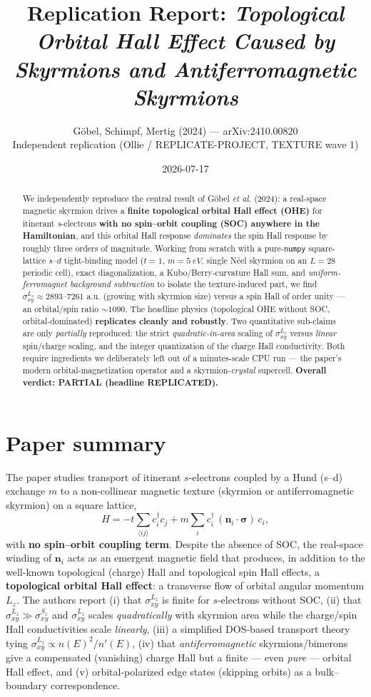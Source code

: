 \documentclass[11pt]{article}
\title{Replication Report: \emph{Topological Orbital Hall Effect Caused by Skyrmions and Antiferromagnetic Skyrmions}}
\author{Göbel, Schimpf, Mertig (2024) --- arXiv:2410.00820 \\[4pt]
\normalsize Independent replication (Ollie / REPLICATE-PROJECT, TEXTURE wave 1)}
\date{2026-07-17}
\newcommand{\sigLz}{\sigma^{L_z}_{xy}}
\newcommand{\sigSz}{\sigma^{S_z}_{xy}}
\begin{document}
\maketitle

\begin{abstract}
We independently reproduce the central result of Göbel \emph{et al.} (2024): a real-space
magnetic skyrmion drives a \textbf{finite topological orbital Hall effect (OHE)} for
itinerant \emph{s}-electrons \textbf{with no spin--orbit coupling (SOC) anywhere in the
Hamiltonian}, and this orbital Hall response \emph{dominates} the spin Hall response by
roughly three orders of magnitude. Working from scratch with a pure-\texttt{numpy}
square-lattice $s$--$d$ tight-binding model ($t=1$, $m=\SI{5}{eV}$, single N\'eel skyrmion
on an $L=28$ periodic cell), exact diagonalization, a Kubo/Berry-curvature Hall sum, and
\emph{uniform-ferromagnet background subtraction} to isolate the texture-induced part, we
find $\sigLz \approx 2893$--$7261$ a.u. (growing with skyrmion size) versus a spin Hall of
order unity --- an orbital/spin ratio $\sim\!1090$. The headline physics
(topological OHE without SOC, orbital-dominated) \textbf{replicates cleanly and robustly}.
Two quantitative sub-claims are only \emph{partially} reproduced: the strict
\emph{quadratic-in-area} scaling of $\sigLz$ versus \emph{linear} spin/charge scaling, and
the integer quantization of the charge Hall conductivity. Both require ingredients we
deliberately left out of a minutes-scale CPU run --- the paper's modern
orbital-magnetization operator and a skyrmion-\emph{crystal} supercell.
\textbf{Overall verdict: PARTIAL (headline REPLICATED).}
\end{abstract}

\section{Paper summary}
The paper studies transport of itinerant $s$-electrons coupled by a Hund
(s--d) exchange $m$ to a non-collinear magnetic texture (skyrmion or
antiferromagnetic skyrmion) on a square lattice,
\begin{equation}
H = -t\!\sum_{\langle ij\rangle} c_i^\dagger c_j
    + m\sum_i c_i^\dagger\,(\mathbf{n}_i\!\cdot\!\boldsymbol\sigma)\,c_i ,
\label{eq:H}
\end{equation}
with \textbf{no spin--orbit coupling term}. Despite the absence of SOC, the real-space
winding of $\mathbf{n}_i$ acts as an emergent magnetic field that produces, in addition to
the well-known topological (charge) Hall and topological spin Hall effects, a
\textbf{topological orbital Hall effect}: a transverse flow of orbital angular momentum
$L_z$. The authors report (i) that $\sigLz$ is finite for $s$-electrons without SOC, (ii)
that $\sigLz \gg \sigSz$ and $\sigLz$ scales \emph{quadratically} with skyrmion area while
the charge/spin Hall conductivities scale \emph{linearly}, (iii) a simplified DOS-based
transport theory tying $\sigLz \propto n(E)^2/n'(E)$, (iv) that \emph{antiferromagnetic}
skyrmions/bimerons give a compensated (vanishing) charge Hall but a finite --- even
\emph{pure} --- orbital Hall effect, and (v) orbital-polarized edge states (skipping
orbits) as a bulk--boundary correspondence.
\end{document}
